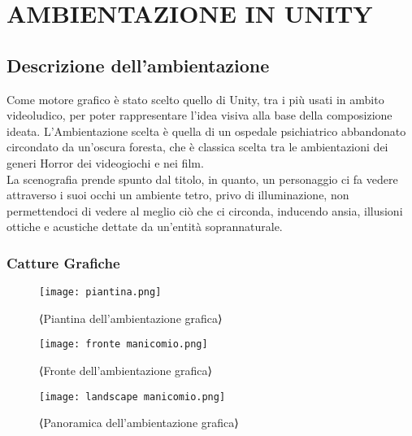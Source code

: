 
\chapter{AMBIENTAZIONE IN UNITY}
\label{chp:Ambientazione in Unity}

\section{Descrizione dell'ambientazione}

Come motore grafico è stato scelto quello di Unity, tra i più usati in ambito videoludico, per poter rappresentare l'idea visiva alla base
della composizione ideata.
L'Ambientazione scelta è quella di un ospedale psichiatrico abbandonato circondato da un'oscura foresta, che è classica scelta tra le ambientazioni dei generi Horror dei videogiochi e nei
film.\\
La scenografia prende spunto dal titolo, in quanto, un personaggio ci fa vedere attraverso i suoi occhi un ambiente tetro, privo
di illuminazione, non permettendoci di vedere al meglio ciò che ci circonda, inducendo ansia, illusioni ottiche e acustiche dettate da 
un'entità soprannaturale.
\\

\subsection*{Catture Grafiche}

\begin{figure}[h]
    \centering
    \texttt{[image: piantina.png]}
    \caption{⟨Piantina dell'ambientazione grafica⟩}
    \label{fig:⟨etichetta⟩}
    \end{figure}

    \begin{figure}[h]
        \centering
        \texttt{[image: fronte manicomio.png]}
        \caption{⟨Fronte dell'ambientazione grafica⟩}
        \label{fig:⟨etichetta⟩}
        \end{figure}

        \begin{figure}[h]
            \centering
            \texttt{[image: landscape manicomio.png]}
            \caption{⟨Panoramica dell'ambientazione grafica⟩}
            \label{fig:⟨etichetta⟩}
            \end{figure}